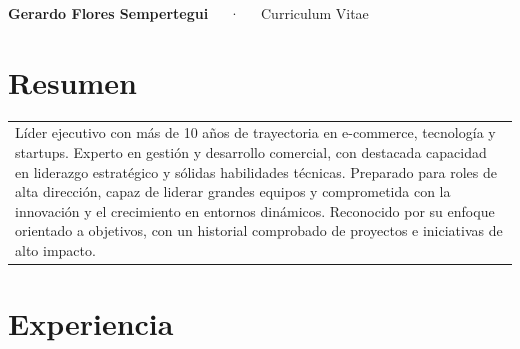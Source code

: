 \documentclass[11pt,a4paper,]{awesome-cv}
\begin{document}
\makecvheader

\makecvfooter
  {}
    {\huge\textbf{Gerardo Flores Sempertegui}~~~·~~~Curriculum Vitae}
  {\thepage}





\thispagestyle{empty}

\smallskip

\vspace{-0.5cm}

\hspace{0.25cm}\color{black}{\Large\faInfoCircle}\hspace{0.25cm}\section{Resumen}

\vspace{-0.25cm}

\begin{tabular}{l}
  \vspace{0.025cm}\parbox{18cm}{ \small{Líder ejecutivo con más de 10 años de trayectoria en e-commerce, tecnología y startups. Experto en gestión y desarrollo comercial, con destacada capacidad en liderazgo estratégico y sólidas habilidades técnicas. Preparado para roles de alta dirección, capaz de liderar grandes equipos y comprometida con la innovación y el crecimiento en entornos dinámicos. Reconocido por su enfoque orientado a objetivos, con un historial comprobado de proyectos e iniciativas de alto impacto.}\hfill } \\ 
  \vspace{-0.20cm} \\ 
  \end{tabular}

\vspace{-0.375cm}

\hspace{0.25cm}\color{black}{\Large\faBriefcase}\hspace{0.25cm}\section{Experiencia}
\end{document}
